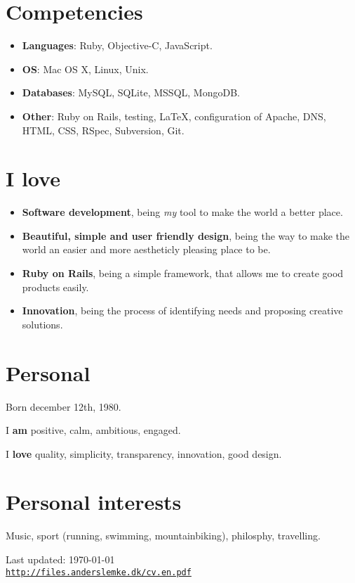 \documentclass[a4paper]{article}
\begin{document}
\section*{Competencies}

\begin{itemize}
\item \textbf{Languages}: Ruby, Objective-C, JavaScript.
\item \textbf{OS}: Mac OS X, Linux, Unix.
\item \textbf{Databases}: MySQL, SQLite, MSSQL, MongoDB.
\item \textbf{Other}: Ruby on Rails, testing, \LaTeX, configuration of Apache, DNS, HTML, CSS, RSpec, Subversion, Git.
\end{itemize}


\section*{I love}

\begin{itemize}
  \item \textbf{Software development}, being \emph{my} tool to make the world a better place.
  \item \textbf{Beautiful, simple and user friendly design}, being the way to make the world an easier and more aestheticly  pleasing place to be.
  \item \textbf{Ruby on Rails}, being a simple framework, that allows me to create good products easily.
  \item \textbf{Innovation}, being the process of identifying needs and proposing creative solutions.
\end{itemize}


\section*{Personal}
Born december 12th, 1980.

I \textbf{am} positive, calm, ambitious, engaged.

I \textbf{love} quality, simplicity, transparency, innovation, good design.

\section*{Personal interests} 

Music, sport (running, swimming, mountainbiking), philosphy, travelling.


\bigskip

\begin{center}
\begin{footnotesize}
Last updated: \today \\
\href{http://files.anderslemke.dk/cv.en.pdf}{\tt http://files.anderslemke.dk/cv.en.pdf}
\end{footnotesize}
\end{center}
\end{document}
